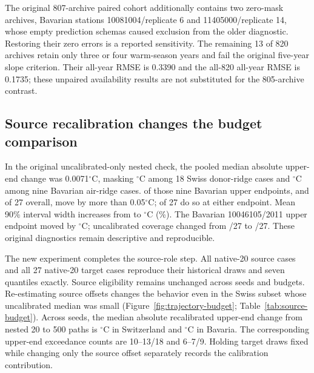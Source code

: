 \documentclass[draft,linenumbers]{agujournal2025}
\begin{document}
The original 807-archive paired cohort additionally contains two zero-mask archives, Bavarian stations 10081004/replicate 6 and 11405000/replicate 14, whose empty prediction schemas caused exclusion from the older diagnostic. Restoring their zero errors is a reported sensitivity. The remaining 13 of 820 archives retain only three or four warm-season years and fail the original five-year slope criterion. Their all-year RMSE is 0.3390 and the all-820 all-year RMSE is 0.1735; these unpaired availability results are not substituted for the 805-archive contrast.



\subsection{Source recalibration changes the budget comparison}
In the original uncalibrated-only nested check, the pooled median absolute upper-end change was 0.0071$^{\circ}$C, masking \PRTrajRevisionSwissUpperMedian{}$^{\circ}$C among 18 Swiss donor-ridge cases and \PRTrajRevisionBavariaUpperMedian{}$^{\circ}$C among nine Bavarian air-ridge cases. \PRTrajRevisionBavariaUpperExceed{} of those nine Bavarian upper endpoints, and \PRTrajRevisionUpperExceed{} of 27 overall, move by more than 0.05$^{\circ}$C; \PRTrajRevisionEitherExceed{} of 27 do so at either endpoint. Mean 90\% interval width increases from \PRTrajRevisionWidthTwenty{} to \PRTrajRevisionWidthFiveHundred{}$^{\circ}$C (\PRTrajRevisionWidthIncrease\%). The Bavarian 10046105/2011 upper endpoint moved by \PRTrajRevisionUpperMax{}$^{\circ}$C; uncalibrated coverage changed from \PRTrajRevisionCoveredTwenty{}/27 to \PRTrajRevisionCoveredFiveHundred{}/27. These original diagnostics remain descriptive and reproducible.

The new experiment completes the source-role step. All \PECalSourceCases{} native-20 source cases and all 27 native-20 target cases reproduce their historical draws and seven quantiles exactly. Source eligibility remains unchanged across seeds and budgets. Re-estimating source offsets changes the behavior even in the Swiss subset whose uncalibrated median was small (Figure~\ref{fig:trajectory-budget}; Table~\ref{tab:source-budget}). Across seeds, the median absolute recalibrated upper-end change from nested 20 to 500 paths is \PECalSwissUpperRange{}$^{\circ}$C in Switzerland and \PECalBavariaUpperRange{}$^{\circ}$C in Bavaria. The corresponding upper-end exceedance counts are 10--13/18 and 6--7/9. Holding target draws fixed while changing only the source offset separately records the calibration contribution.
\end{document}
